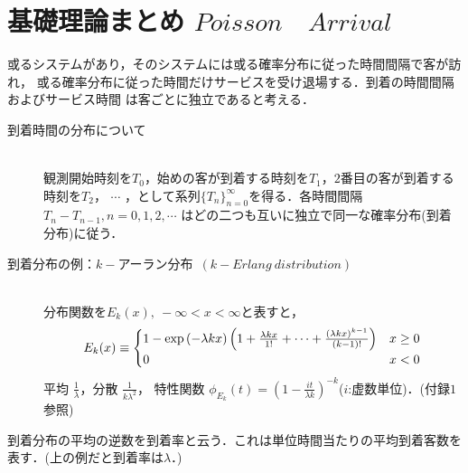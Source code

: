 \documentclass[a4j,papersize,disablejfam,slide,14pt]{jsarticle}
\def\exp#1{\mbox{${\rm exp} \left( #1 \right)$}} %
\begin{document}
\section{基礎理論まとめ \qquad $Poisson\quad Arrival$}
    \begin{screen}
    或るシステムがあり，そのシステムには或る確率分布に従った時間間隔で客が訪れ，
    或る確率分布に従った時間だけサービスを受け退場する．到着の時間間隔およびサービス時間
    は客ごとに独立であると考える．
    \end{screen}
    \begin{description}
    	\item[到着時間の分布について]\mbox{}\\
    	観測開始時刻を$T_0$，始めの客が到着する時刻を$T_1$，$2$番目の客が到着する時刻を$T_2$，
    	$\cdots$ ，として系列$\{T_n\}_{n=0}^{\infty}$を得る．各時間間隔$T_n - T_{n-1}, n=0,1,2,\cdots$
    	はどの二つも互いに独立で同一な確率分布(到着分布)に従う．
    \end{description}
    \begin{description}
    	\item[到着分布の例：$k-$アーラン分布\ $(k-Erlang\ distribution)$]\mbox{}\\
    		分布関数を$E_k(x),\ -\infty < x < \infty$と表すと，
    		\begin{equation}
    			E_k(x) \equiv
        		\begin{cases}
        			1 - \exp{-\lambda k x} \left( 1 + \frac{\lambda k x}{1!} + \cdots + \frac{(\lambda k x)^{k-1}}{(k-1)!} \right) & \text{$x \geq 0$}\\
    				0 & \text{$x < 0$}
        		\end{cases}
    		\end{equation}
            平均 $\frac{1}{\lambda}$，分散 $\frac{1}{k\lambda^2}$，
            特性関数 $\phi_{E_k}(t) = \left( 1 - \frac{it}{\lambda k} \right)^{-k}$($i$:虚数単位)．(付録$1$参照)
    \end{description}
    到着分布の平均の逆数を到着率と云う．これは単位時間当たりの平均到着客数を表す．(上の例だと到着率は$\lambda$．)

\newpage
\end{document}
